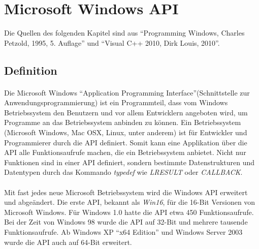 \newpage

\section{Microsoft Windows API}

Die Quellen des folgenden Kapitel sind aus "`Programming Windows, Charles Petzold, 1995, 5. Auflage"' und "`Visual C++ 2010, Dirk Louis, 2010"'.

\subsection{Definition}

\paragraph{}
Die Microsoft Windows "`Application Programming Interface"'(Schnittstelle zur Anwendungsprogrammierung) ist ein Programmteil, dass vom Windows Betriebssystem den Benutzern und vor allem Entwicklern angeboten wird, um Programme an das Betriebssystem anbinden zu können. Ein Betriebssystem (Microsoft Windows, Mac OSX, Linux, unter anderem) ist für Entwickler und Programmierer durch die API definiert. Somit kann eine Applikation über die API alle Funktionsaufrufe machen, die ein Betriebssystem anbietet. Nicht nur Funktionen sind in einer API definiert, sondern bestimmte Datenstrukturen und Datentypen durch das Kommando \textit{typedef} wie \textit{LRESULT} oder \textit{CALLBACK}.
\paragraph{}
Mit fast jedes neue Microsoft Betriebssystem wird die Windows API erweitert und abgeändert. Die erste API, bekannt als \textit{Win16}, für die 16-Bit Versionen von Microsoft Windows. Für Windows 1.0 hatte die API etwa 450 Funktionsaufrufe. Bei der Zeit von Windows 98 wurde die API auf 32-Bit und mehrere tausende Funktionsaufrufe. Ab Windows XP "`x64 Edition"' und Windows Server 2003 wurde die API auch auf 64-Bit erweitert.
